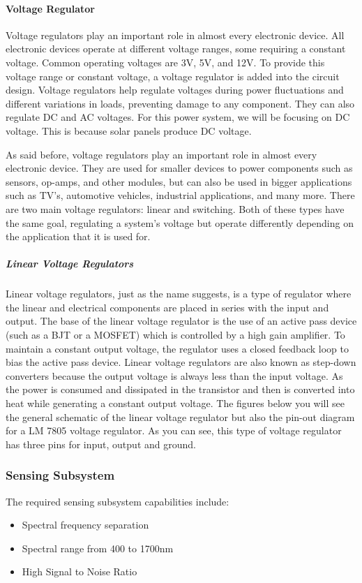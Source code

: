 \paragraph{Voltage Regulator}
Voltage regulators play an important role in almost every electronic device. All electronic devices operate at different voltage ranges, some requiring a constant voltage. Common operating voltages are 3V, 5V, and 12V. To provide this voltage range or constant voltage, a voltage regulator is added into the circuit design. Voltage regulators help regulate voltages during power fluctuations and different variations in loads, preventing damage to any component. They can also regulate DC and AC voltages. For this power system, we will be focusing on DC voltage. This is because solar panels produce DC voltage. \par
As said before, voltage regulators play an important role in almost every electronic device. They are used for smaller devices to power components such as sensors, op-amps, and other modules, but can also be used in bigger applications such as TV’s, automotive vehicles, industrial applications, and many more. There are two main voltage regulators: linear and switching. Both of these types have the same goal, regulating a system’s voltage but operate differently depending on the application that it is used for. \par
\subparagraph{Linear Voltage Regulators}
Linear voltage regulators, just as the name suggests, is a type of regulator where the linear and electrical components are placed in series with the input and output. The base of the linear voltage regulator is the use of an active pass device (such as a BJT or a MOSFET) which is controlled by a high gain amplifier. To maintain a constant output voltage, the regulator uses a closed feedback loop to bias the active pass device. Linear voltage regulators are also known as step-down converters because the output voltage is always less than the input voltage. As the power is consumed and dissipated in the transistor and then is converted into heat while generating a constant output voltage. The figures below you will see the general schematic of the linear voltage regulator but also the pin-out diagram for a LM 7805 voltage regulator. As you can see, this type of voltage regulator has three pins for input, output and ground.\par


\subsubsection{Sensing Subsystem}
The required sensing subsystem capabilities include:
    \begin{itemize}
        \item Spectral frequency separation
        \item Spectral range from 400 to 1700nm
        \item High Signal to Noise Ratio
    \end{itemize}


